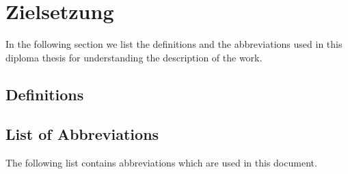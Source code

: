 \section{Zielsetzung}
\label{sec:Zielsetzung}

In the following section we list the definitions and the abbreviations used in this diploma thesis for understanding the description of the work.

\subsection*{Definitions}

\subsection*{List of Abbreviations}

The following list contains abbreviations which are used in this document. 

